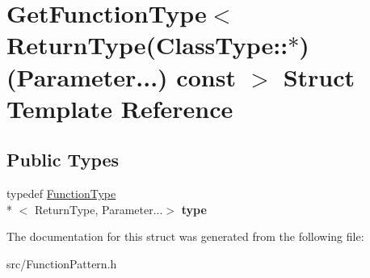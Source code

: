 \hypertarget{struct_get_function_type_3_01_return_type_07_class_type_1_1_5_08_07_parameter_8_8_8_08_01const_01_01_4}{\section{Get\-Function\-Type$<$ Return\-Type(Class\-Type\-:\-:$\ast$)(Parameter...) const $>$ Struct Template Reference}
\label{struct_get_function_type_3_01_return_type_07_class_type_1_1_5_08_07_parameter_8_8_8_08_01const_01_01_4}
}
\subsection*{Public Types}
\begin{DoxyCompactItemize}
\item 
\hypertarget{struct_get_function_type_3_01_return_type_07_class_type_1_1_5_08_07_parameter_8_8_8_08_01const_01_01_4_a489d46f606c670f390d55ed946f85577}{typedef \hyperlink{struct_function_type}{Function\-Type}\\*
$<$ Return\-Type, Parameter...$>$ {\bfseries type}}\label{struct_get_function_type_3_01_return_type_07_class_type_1_1_5_08_07_parameter_8_8_8_08_01const_01_01_4_a489d46f606c670f390d55ed946f85577}

\end{DoxyCompactItemize}


The documentation for this struct was generated from the following file\-:\begin{DoxyCompactItemize}
\item 
src/Function\-Pattern.\-h\end{DoxyCompactItemize}
